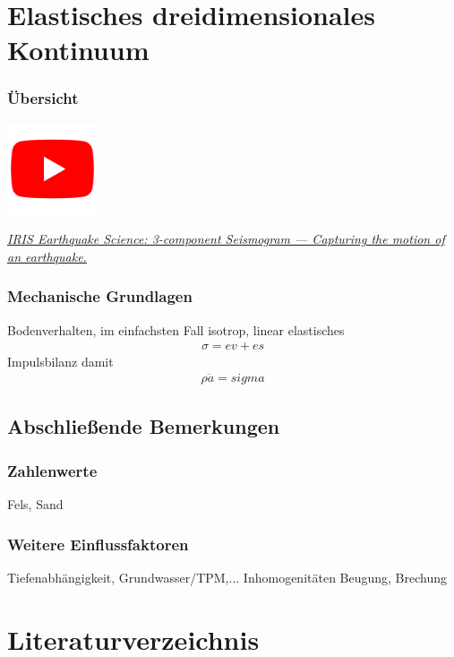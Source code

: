 \documentclass[hyperref={pdfpagemode=FullScreen, colorlinks=false}]{beamer}
\begin{document}
\maketitle

\section{Elastisches dreidimensionales Kontinuum}

\begin{frame}
\frametitle{Übersicht}
\begin{center}
\includegraphics[width=0.2\textwidth]{fig_img/youtube.png}   
\end{center}

\href{https://www.youtube.com/watch?v=Za_22xo7ZQQ}{\textsl{IRIS Earthquake Science: 3-component Seismogram --- Capturing the motion of an earthquake.}}

\end{frame}

\begin{frame}
\frametitle{Mechanische Grundlagen}
Bodenverhalten, im einfachsten Fall isotrop, linear elastisches
\begin{align*}
 \sigma = ev + es
\end{align*}
Impulsbilanz damit
\begin{align*}
 \rho \ddot{a} =sigma
\end{align*}


\end{frame}






\subsection{Abschließende Bemerkungen}
\begin{frame}
\frametitle{Zahlenwerte}
Fels, Sand
\end{frame}

\begin{frame}
\frametitle{Weitere Einflussfaktoren}
Tiefenabhängigkeit, Grundwasser/TPM,...
Inhomogenitäten
Beugung, Brechung
\end{frame}




\section*{Literaturverzeichnis}

\begin{frame}[allowframebreaks]{}
	\printbibliography
\end{frame}
\end{document}

